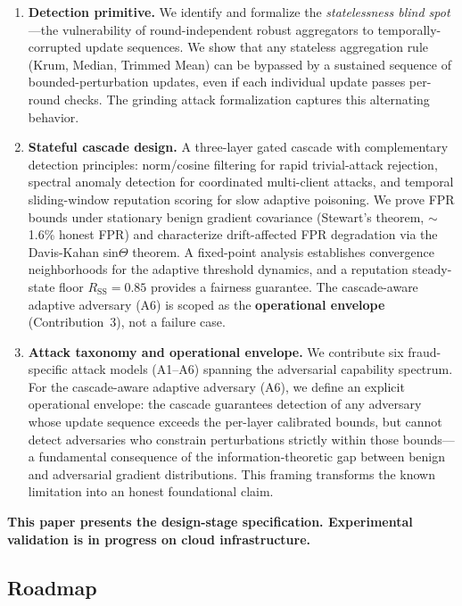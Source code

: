 \documentclass[10pt,journal]{IEEEtran}
\begin{document}
\begin{enumerate}
  \item \textbf{Detection primitive.} We identify and formalize the \emph{statelessness blind spot}---the vulnerability of round-independent robust aggregators to temporally-corrupted update sequences. We show that any stateless aggregation rule (Krum, Median, Trimmed Mean) can be bypassed by a sustained sequence of bounded-perturbation updates, even if each individual update passes per-round checks. The grinding attack formalization captures this alternating behavior.

  \item \textbf{Stateful cascade design.} A three-layer gated cascade with complementary detection principles: norm/cosine filtering for rapid trivial-attack rejection, spectral anomaly detection for coordinated multi-client attacks, and temporal sliding-window reputation scoring for slow adaptive poisoning. We prove FPR bounds under stationary benign gradient covariance (Stewart's theorem, $\sim$1.6\% honest FPR) and characterize drift-affected FPR degradation via the Davis-Kahan sin$\Theta$ theorem. A fixed-point analysis establishes convergence neighborhoods for the adaptive threshold dynamics, and a reputation steady-state floor $R_{\text{SS}} = 0.85$ provides a fairness guarantee. The cascade-aware adaptive adversary (A6) is scoped as the \textbf{operational envelope} (Contribution~3), not a failure case.

  \item \textbf{Attack taxonomy and operational envelope.} We contribute six fraud-specific attack models (A1--A6) spanning the adversarial capability spectrum. For the cascade-aware adaptive adversary (A6), we define an explicit operational envelope: the cascade guarantees detection of any adversary whose update sequence exceeds the per-layer calibrated bounds, but cannot detect adversaries who constrain perturbations strictly within those bounds---a fundamental consequence of the information-theoretic gap between benign and adversarial gradient distributions. This framing transforms the known limitation into an honest foundational claim.
\end{enumerate}

\textbf{This paper presents the design-stage specification. Experimental validation is in progress on cloud infrastructure.}

\subsection{Roadmap}
\end{document}
